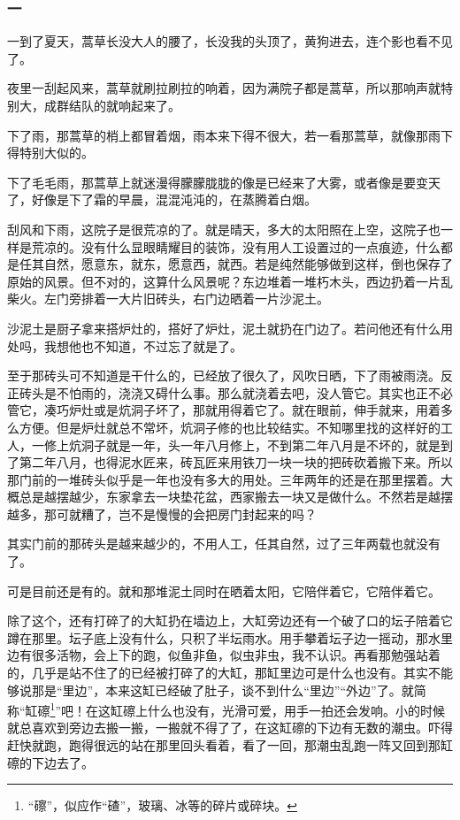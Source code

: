 \subsubsection*{一}
\par 一到了夏天，蒿草长没大人的腰了，长没我的头顶了，黄狗进去，连个影也看不见了。
\par 夜里一刮起风来，蒿草就刷拉刷拉的响着，因为满院子都是蒿草，所以那响声就特别大，成群结队的就响起来了。
\par 下了雨，那蒿草的梢上都冒着烟，雨本来下得不很大，若一看那蒿草，就像那雨下得特别大似的。
\par 下了毛毛雨，那蒿草上就迷漫得朦朦胧胧的像是已经来了大雾，或者像是要变天了，好像是下了霜的早晨，混混沌沌的，在蒸腾着白烟。
\par 刮风和下雨，这院子是很荒凉的了。就是晴天，多大的太阳照在上空，这院子也一样是荒凉的。没有什么显眼睛耀目的装饰，没有用人工设置过的一点痕迹，什么都是任其自然，愿意东，就东，愿意西，就西。若是纯然能够做到这样，倒也保存了原始的风景。但不对的，这算什么风景呢？东边堆着一堆朽木头，西边扔着一片乱柴火。左门旁排着一大片旧砖头，右门边晒着一片沙泥土。
\par 沙泥土是厨子拿来搭炉灶的，搭好了炉灶，泥土就扔在门边了。若问他还有什么用处吗，我想他也不知道，不过忘了就是了。
\par 至于那砖头可不知道是干什么的，已经放了很久了，风吹日晒，下了雨被雨浇。反正砖头是不怕雨的，浇浇又碍什么事。那么就浇着去吧，没人管它。其实也正不必管它，凑巧炉灶或是炕洞子坏了，那就用得着它了。就在眼前，伸手就来，用着多么方便。但是炉灶就总不常坏，炕洞子修的也比较结实。不知哪里找的这样好的工人，一修上炕洞子就是一年，头一年八月修上，不到第二年八月是不坏的，就是到了第二年八月，也得泥水匠来，砖瓦匠来用铁刀一块一块的把砖砍着搬下来。所以那门前的一堆砖头似乎是一年也没有多大的用处。三年两年的还是在那里摆着。大概总是越摆越少，东家拿去一块垫花盆，西家搬去一块又是做什么。不然若是越摆越多，那可就糟了，岂不是慢慢的会把房门封起来的吗？
\par 其实门前的那砖头是越来越少的，不用人工，任其自然，过了三年两载也就没有了。
\par 可是目前还是有的。就和那堆泥土同时在晒着太阳，它陪伴着它，它陪伴着它。
\par 除了这个，还有打碎了的大缸扔在墙边上，大缸旁边还有一个破了口的坛子陪着它蹲在那里。坛子底上没有什么，只积了半坛雨水。用手攀着坛子边一摇动，那水里边有很多活物，会上下的跑，似鱼非鱼，似虫非虫，我不认识。再看那勉强站着的，几乎是站不住了的已经被打碎了的大缸，那缸里边可是什么也没有。其实不能够说那是“里边”，本来这缸已经破了肚子，谈不到什么“里边”“外边”了。就简称“缸䃰\footnote{“䃰”，似应作“碴”，玻璃、冰等的碎片或碎块。}”吧！在这缸䃰上什么也没有，光滑可爱，用手一拍还会发响。小的时候就总喜欢到旁边去搬一搬，一搬就不得了了，在这缸䃰的下边有无数的潮虫。吓得赶快就跑，跑得很远的站在那里回头看着，看了一回，那潮虫乱跑一阵又回到那缸䃰的下边去了。
